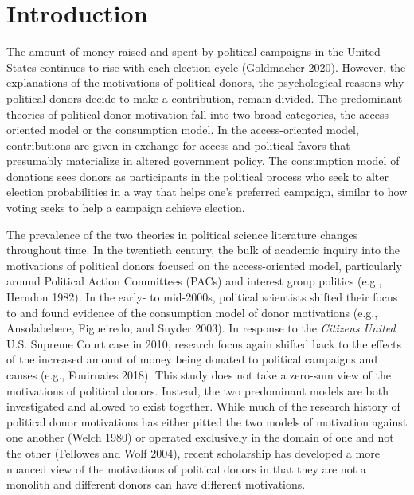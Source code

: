 \documentclass[12pt,]{article}
\begin{document}
\vskip -8.5pt



\noindent \doublespacing 

\newpage

\hypertarget{introduction}{%
\section{Introduction}\label{introduction}}

The amount of money raised and spent by political campaigns in the
United States continues to rise with each election cycle (Goldmacher
2020). However, the explanations of the motivations of political donors,
the psychological reasons why political donors decide to make a
contribution, remain divided. The predominant theories of political
donor motivation fall into two broad categories, the access-oriented
model or the consumption model. In the access-oriented model,
contributions are given in exchange for access and political favors that
presumably materialize in altered government policy. The consumption
model of donations sees donors as participants in the political process
who seek to alter election probabilities in a way that helps one's
preferred campaign, similar to how voting seeks to help a campaign
achieve election.

The prevalence of the two theories in political science literature
changes throughout time. In the twentieth century, the bulk of academic
inquiry into the motivations of political donors focused on the
access-oriented model, particularly around Political Action Committees
(PACs) and interest group politics (e.g., Herndon 1982). In the early-
to mid-2000s, political scientists shifted their focus to and found
evidence of the consumption model of donor motivations (e.g.,
Ansolabehere, Figueiredo, and Snyder 2003). In response to the
\emph{Citizens United} U.S. Supreme Court case in 2010, research focus
again shifted back to the effects of the increased amount of money being
donated to political campaigns and causes (e.g., Fouirnaies 2018). This
study does not take a zero-sum view of the motivations of political
donors. Instead, the two predominant models are both investigated and
allowed to exist together. While much of the research history of
political donor motivations has either pitted the two models of
motivation against one another (Welch 1980) or operated exclusively in
the domain of one and not the other (Fellowes and Wolf 2004), recent
scholarship has developed a more nuanced view of the motivations of
political donors in that they are not a monolith and different donors
can have different motivations.
\end{document}
